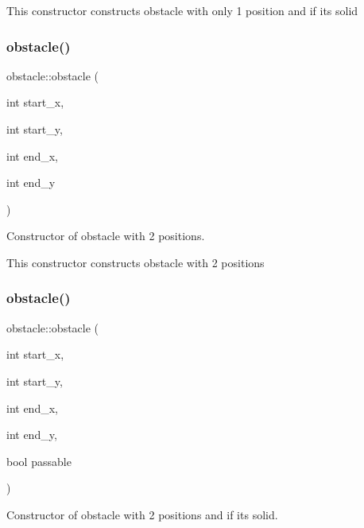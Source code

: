 This constructor constructs obstacle with only 1 position and if it\textquotesingle{}s solid \mbox{\label{classobstacle_a39b2e95776adad7254a2fbe0239364a0}} 
\subsubsection{\texorpdfstring{obstacle()}{obstacle()}\hspace{0.1cm}{\footnotesize\ttfamily [3/4]}}
{\footnotesize\ttfamily obstacle\+::obstacle (\begin{DoxyParamCaption}\item[{int}]{start\+\_\+x,  }\item[{int}]{start\+\_\+y,  }\item[{int}]{end\+\_\+x,  }\item[{int}]{end\+\_\+y }\end{DoxyParamCaption})\hspace{0.3cm}{\ttfamily [inline]}}



Constructor of obstacle with 2 positions. 

This constructor constructs obstacle with 2 positions \mbox{\label{classobstacle_a94dfef60582ffd9f6b08012d61bc4ad3}} 
\subsubsection{\texorpdfstring{obstacle()}{obstacle()}\hspace{0.1cm}{\footnotesize\ttfamily [4/4]}}
{\footnotesize\ttfamily obstacle\+::obstacle (\begin{DoxyParamCaption}\item[{int}]{start\+\_\+x,  }\item[{int}]{start\+\_\+y,  }\item[{int}]{end\+\_\+x,  }\item[{int}]{end\+\_\+y,  }\item[{bool}]{passable }\end{DoxyParamCaption})\hspace{0.3cm}{\ttfamily [inline]}}



Constructor of obstacle with 2 positions and if it\textquotesingle{}s solid. 

